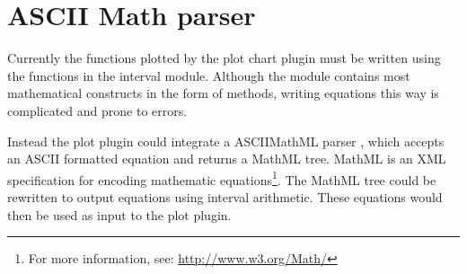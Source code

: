 \section{ASCII Math parser}
Currently the functions plotted by the plot chart plugin must be written using the functions in the interval module. Although the module contains most mathematical constructs in the form of methods, writing equations this way is complicated and prone to errors.

Instead the plot plugin could integrate a ASCIIMathML parser \cite{jipsen07}, which accepts an ASCII formatted equation and returns a MathML tree. MathML is an XML specification for encoding mathematic equations\footnote{For more information, see: \url{http://www.w3.org/Math/}}. The MathML tree could be rewritten to output equations using interval arithmetic. These equations would then be used as input to the plot plugin.

